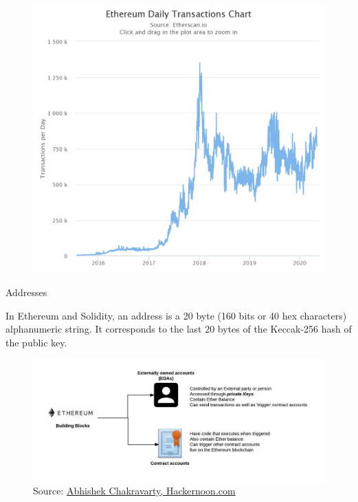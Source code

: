 \documentclass{beamer}
\begin{document}
    \begin{frame}{}
        \begin{figure}
            \includegraphics[scale=0.235]{daily_txs_chart.png}
            \caption{}\label{fig:daily_txs_chart}
        \end{figure}
    \end{frame}

    \begin{frame}{Addresses}
        \begin{block}{}
            In Ethereum and Solidity, an address is a 20 byte (160 bits or 40 hex characters) alphanumeric string.
            It corresponds to the last 20 bytes of the Keccak-256 hash of the public key.
        \end{block}

        \begin{figure}
            \includegraphics[width=\textwidth]{types_of_addresses.jpeg}
            \caption{Source: \href{https://hackernoon.com/heres-how-i-built-a-private-blockchain-network-and-you-can-too-62ca7db556c0}{Abhishek Chakravarty, Hackernoon.com}}\label{fig:types_of_addresses}
        \end{figure}

    \end{frame}
\end{document}
